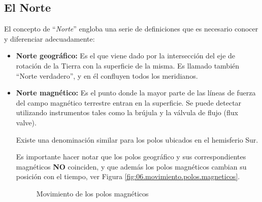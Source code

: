  \subsection{El Norte}
 \label{sec:el.norte}
 El concepto de ``\emph{Norte}'' engloba una serie de definiciones que es necesario conocer y diferenciar adecuadamente:

\begin{itemize}
\item\textbf{ Norte geográfico: }Es el que viene dado por la intersección del eje de rotación de la Tierra con la superficie de la misma. Es llamado también ``Norte verdadero'', y en él confluyen todos los meridianos.

\item \textbf{Norte magnético:} Es el punto donde la mayor parte de las líneas de fuerza del campo magnético terrestre entran en la superficie. Se puede detectar utilizando instrumentos tales como la brújula y la v\'alvula de flujo (flux valve).

Existe una denominaci\'on similar para los polos ubicados en el hemisferio Sur.

Es importante hacer notar que los polos geográfico y sus correspondientes  magnéticos \textbf{NO} coinciden, y que además los polos magnéticos cambian su posición con el tiempo, ver Figura \ref{fig:06.movimiento.polos.magneticos}.

\begin{figure}[!htb]
  \centering
  \caption{Movimiento de los polos magn\'eticos \protect\cite{MovimientoPolosMagneticos} 
}


\end{figure}
\end{itemize}
